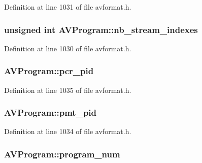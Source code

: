 Definition at line 1031 of file avformat.\+h.

\subsubsection[{\texorpdfstring{nb\+\_\+stream\+\_\+indexes}{nb_stream_indexes}}]{\setlength{\rightskip}{0pt plus 5cm}unsigned {\bf int} A\+V\+Program\+::nb\+\_\+stream\+\_\+indexes}\hypertarget{struct_a_v_program_a136cf29d2aa5b0e4c6d743406c5e39d1}{}\label{struct_a_v_program_a136cf29d2aa5b0e4c6d743406c5e39d1}


Definition at line 1030 of file avformat.\+h.

\subsubsection[{\texorpdfstring{pcr\+\_\+pid}{pcr_pid}}]{ A\+V\+Program\+::pcr\+\_\+pid}\hypertarget{struct_a_v_program_a7e026323df87e84a72ec5e5c8ce341a5}{}\label{struct_a_v_program_a7e026323df87e84a72ec5e5c8ce341a5}


Definition at line 1035 of file avformat.\+h.

\subsubsection[{\texorpdfstring{pmt\+\_\+pid}{pmt_pid}}]{ A\+V\+Program\+::pmt\+\_\+pid}\hypertarget{struct_a_v_program_a02011963a63c291c6dc6d4eefa56cd69}{}\label{struct_a_v_program_a02011963a63c291c6dc6d4eefa56cd69}


Definition at line 1034 of file avformat.\+h.

\subsubsection[{\texorpdfstring{program\+\_\+num}{program_num}}]{ A\+V\+Program\+::program\+\_\+num}\hypertarget{struct_a_v_program_a4c1539ea3c98da979b95a59a3ea163cb}{}\label{struct_a_v_program_a4c1539ea3c98da979b95a59a3ea163cb}


